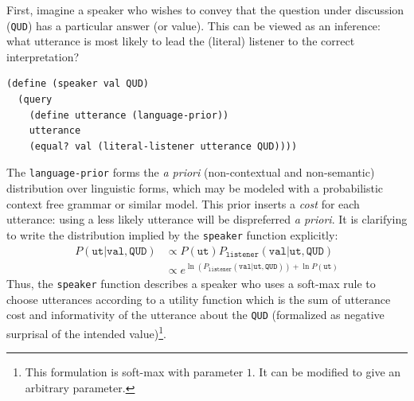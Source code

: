 \documentclass[pdfextras]{handbook}
\begin{document}
First, imagine a speaker who wishes to convey that the question under discussion (\lstinline{QUD}) has a particular answer (or value). This can be viewed as an inference: what utterance is most likely to lead the (literal) listener to the correct interpretation?
\begin{lstlisting}
(define (speaker val QUD)
  (query
    (define utterance (language-prior))
    utterance
    (equal? val (literal-listener utterance QUD))))
\end{lstlisting}
The \lstinline{language-prior} forms the \emph{a priori} (non-contextual and non-semantic) distribution over linguistic forms, which may be modeled with a probabilistic context free grammar or similar model. 
This prior inserts a \emph{cost} for each utterance: using a less likely utterance will be dispreferred \emph{a priori}.
It is clarifying to write the distribution implied by the \lstinline{speaker} function explicitly:
\begin{align}
P(\texttt{ut} | \texttt{val}, \texttt{QUD}) &\propto P(\texttt{ut}) P_{\texttt{listener}}(\texttt{val} | \texttt{ut}, \texttt{QUD}) \\
&\propto e^{\ln(P_{\texttt{listener}}(\texttt{val} | \texttt{ut}, \texttt{QUD})) + \ln{P(\texttt{ut})}}
\end{align}
Thus, the \lstinline{speaker} function describes a speaker who uses a soft-max rule \citep{luce59,suttonbarto98} to choose utterances according to a utility function which is the sum of utterance cost and informativity of the utterance about the \lstinline{QUD} (formalized as negative surprisal of the intended value)\footnote{This formulation is soft-max with parameter $1$. It can be modified to give an arbitrary parameter.}.
\end{document}
